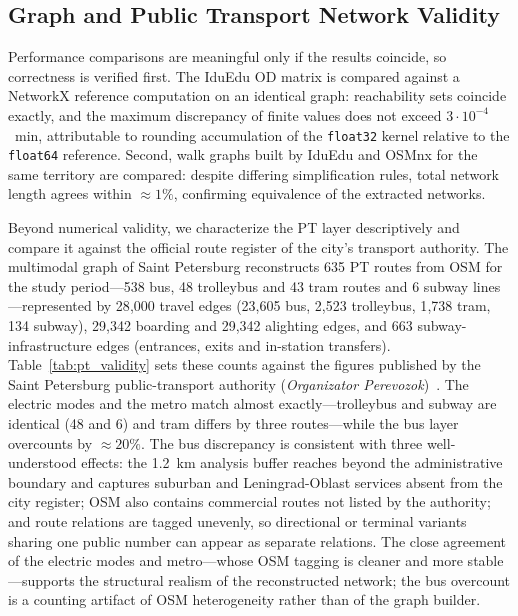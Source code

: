 \documentclass[smartcities,article,submit,moreauthors]{Definitions/mdpi}
\begin{document}
    \subsection{Graph and Public Transport Network Validity}
    \label{subsec:res-validity}

    Performance comparisons are meaningful only if the results coincide, so correctness is verified
    first.
    The IduEdu OD matrix is compared against a NetworkX reference computation on an identical graph:
    reachability sets coincide exactly, and the maximum discrepancy of finite values does not exceed
    $3\cdot10^{-4}$~min, attributable to rounding accumulation of the \texttt{float32} kernel relative
    to the \texttt{float64} reference.
    Second, walk graphs built by IduEdu and OSMnx for the same territory are compared: despite
    differing simplification rules, total network length agrees within ${\approx}1\%$, confirming
    equivalence of the extracted networks.

    Beyond numerical validity, we characterize the PT layer descriptively and compare it against the
    official route register of the city's transport authority.
    The multimodal graph of Saint Petersburg reconstructs 635 PT routes from OSM for the study
    period---538 bus, 48 trolleybus and 43 tram routes and 6 subway lines---represented by 28{,}000
    travel edges (23{,}605 bus, 2{,}523 trolleybus, 1{,}738 tram, 134 subway), 29{,}342 boarding and
    29{,}342 alighting edges, and 663 subway-infrastructure edges (entrances, exits and in-station
    transfers).
    Table~\ref{tab:pt_validity} sets these counts against the figures published by the Saint
    Petersburg public-transport authority (\emph{Organizator Perevozok})~\cite{orgp_spb}.
    The electric modes and the metro match almost exactly---trolleybus and subway are identical (48
    and 6) and tram differs by three routes---while the bus layer overcounts by ${\approx}20\%$.
    The bus discrepancy is consistent with three well-understood effects: the 1.2~km analysis buffer
    reaches beyond the administrative boundary and captures suburban and Leningrad-Oblast services
    absent from the city register; OSM also contains commercial routes not listed by the authority;
    and route relations are tagged unevenly, so directional or terminal variants sharing one public
    number can appear as separate relations.
    The close agreement of the electric modes and metro---whose OSM tagging is cleaner and more
    stable---supports the structural realism of the reconstructed network; the bus overcount is a
    counting artifact of OSM heterogeneity rather than of the graph builder.
\end{document}

